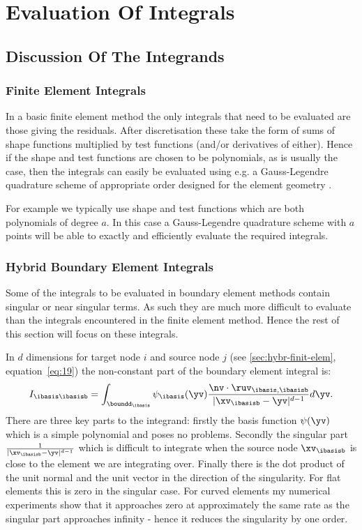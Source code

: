 
\chapter{Evaluation Of Integrals}

\section{Discussion Of The Integrands}

\subsection{Finite Element Integrals}

In a basic finite element method the only integrals that need to be evaluated are those giving the residuals. After discretisation these take the form of sums of shape functions multiplied by test functions (and/or derivatives of either). Hence if the shape and test functions are chosen to be polynomials, as is usually the case, then the integrals can easily be evaluated using e.g. a Gauss-Legendre quadrature scheme of appropriate order designed for the element geometry \cite{??ds: Gauss-Legendre schemes for arbitrary geometry, Milan gave Mousavi2010 but it is more about polygons with large numbers of sides not 3D ones}.

For example we typically use shape and test functions which are both polynomials of degree $a$. In this case a Gauss-Legendre quadrature scheme with $a$ points  will be able to exactly and efficiently evaluate the required integrals.

\subsection{Hybrid Boundary Element Integrals}

Some of the integrals to be evaluated in boundary element methods contain singular or near singular terms. As such they are much more difficult to evaluate than the integrals encountered in the finite element method. Hence the rest of this section will focus on these integrals.

In $d$ dimensions for target node $i$ and source node $j$ (see \autoref{sec:hybr-finit-elem}, equation~\eqref{eq:19}) the non-constant part of the boundary element integral is:
\begin{equation}
  \label{eq:7}
   I_{\ibasis\ibasisb} = \int_{\boundd_\ibasis} \psi_\ibasis(\yv) \frac{\nv \cdot \ruv_{\ibasis,\ibasisb}}{| \xv_\ibasisb - \yv| ^{d-1}} d\yv.
\end{equation}
There are three key parts to the integrand: firstly the basis function $\psi(\yv)$ which is a simple polynomial and poses no problems. Secondly the singular part $ \frac{1}{|\xv_\ibasisb - \yv| ^{d-1}}$ which is difficult to integrate when the source node $\xv_\ibasisb$ is close to the element we are integrating over. Finally there is the dot product of the unit normal and the unit vector in the direction of the singularity. For flat elements this is zero in the singular case. For curved elements my numerical experiments show that it approaches zero at approximately the same rate as the singular part approaches infinity - hence it reduces the singularity by one order.

